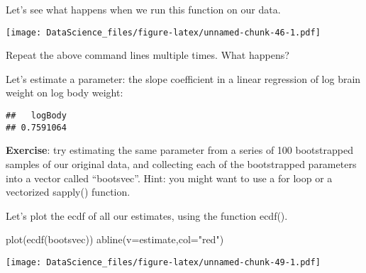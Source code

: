 \documentclass[
]{book}
\newenvironment{Shaded}{\begin{snugshade}}{\end{snugshade}}
\newcommand{\AttributeTok}[1]{\textcolor[rgb]{0.77,0.63,0.00}{#1}}
\newcommand{\DecValTok}[1]{\textcolor[rgb]{0.00,0.00,0.81}{#1}}
\newcommand{\FunctionTok}[1]{\textcolor[rgb]{0.00,0.00,0.00}{#1}}
\newcommand{\NormalTok}[1]{#1}
\newcommand{\OtherTok}[1]{\textcolor[rgb]{0.56,0.35,0.01}{#1}}
\newcommand{\SpecialCharTok}[1]{\textcolor[rgb]{0.00,0.00,0.00}{#1}}
\newcommand{\StringTok}[1]{\textcolor[rgb]{0.31,0.60,0.02}{#1}}
\begin{document}
Let's see what happens when we run this function on our data.

\begin{Shaded}
\end{Shaded}

\texttt{[image: DataScience\_files/figure-latex/unnamed-chunk-46-1.pdf]}

Repeat the above command lines multiple times. What happens?

Let's estimate a parameter: the slope coefficient in a linear regression of log brain weight on log body weight:

\begin{Shaded}
\end{Shaded}

\begin{verbatim}
##   logBody 
## 0.7591064
\end{verbatim}

\textbf{Exercise}: try estimating the same parameter from a series of 100 bootstrapped samples of our original data, and collecting each of the bootstrapped parameters into a vector called ``bootsvec''. Hint: you might want to use a for loop or a vectorized sapply() function.

Let's plot the ecdf of all our estimates, using the function ecdf().

\begin{Shaded}
\begin{Highlighting}[]
\FunctionTok{plot}\NormalTok{(}\FunctionTok{ecdf}\NormalTok{(bootsvec))}
\FunctionTok{abline}\NormalTok{(}\AttributeTok{v=}\NormalTok{estimate,}\AttributeTok{col=}\StringTok{"red"}\NormalTok{)}
\end{Highlighting}
\end{Shaded}

\texttt{[image: DataScience\_files/figure-latex/unnamed-chunk-49-1.pdf]}
\end{document}
